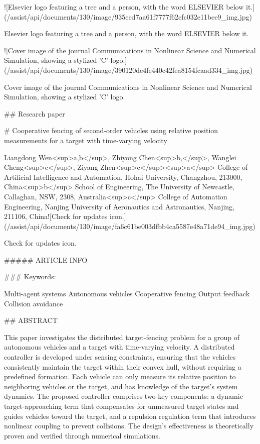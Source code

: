 

![Elsevier logo featuring a tree and a person, with the word ELSEVIER below it.](/assist/api/documents/130/image/935eed7aa61f7777f62cfc032e11bee9_img.jpg)

Elsevier logo featuring a tree and a person, with the word ELSEVIER below it.

![Cover image of the journal Communications in Nonlinear Science and Numerical Simulation, showing a stylized 'C' logo.](/assist/api/documents/130/image/390120de4fe440c42fea8154fcaad334_img.jpg)

Cover image of the journal Communications in Nonlinear Science and Numerical Simulation, showing a stylized 'C' logo.

## Research paper

# Cooperative fencing of second-order vehicles using relative position measurements for a target with time-varying velocity

Liangdong Wen<sup>a,b</sup>, Zhiyong Chen<sup>b,\*</sup>, Wanglei Cheng<sup>c</sup>, Ziyang Zhen<sup>c</sup><sup>a</sup> College of Artificial Intelligence and Automation, Hohai University, Changzhou, 213000, China<sup>b</sup> School of Engineering, The University of Newcastle, Callaghan, NSW, 2308, Australia<sup>c</sup> College of Automation Engineering, Nanjing University of Aeronautics and Astronautics, Nanjing, 211106, China![Check for updates icon.](/assist/api/documents/130/image/fa6c61be003dfbb4ca5587e48a71de94_img.jpg)

Check for updates icon.

##### ARTICLE INFO

### Keywords:

Multi-agent systems  
Autonomous vehicles  
Cooperative fencing  
Output feedback  
Collision avoidance

## ABSTRACT

This paper investigates the distributed target-fencing problem for a group of autonomous vehicles and a target with time-varying velocity. A distributed controller is developed under sensing constraints, ensuring that the vehicles consistently maintain the target within their convex hull, without requiring a predefined formation. Each vehicle can only measure its relative position to neighboring vehicles or the target, and has knowledge of the target's system dynamics. The proposed controller comprises two key components: a dynamic target-approaching term that compensates for unmeasured target states and guides vehicles toward the target, and a repulsion regulation term that introduces nonlinear coupling to prevent collisions. The design's effectiveness is theoretically proven and verified through numerical simulations.

